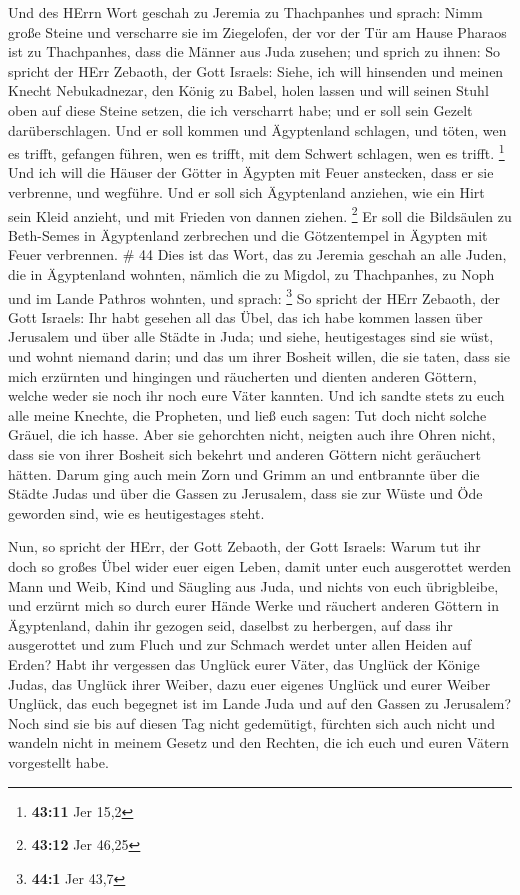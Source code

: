  Und des HErrn Wort geschah zu Jeremia zu Thachpanhes und
sprach:  Nimm große Steine und verscharre sie im Ziegelofen,
der vor der Tür am Hause Pharaos ist zu Thachpanhes, dass die Männer aus
Juda zusehen;  und sprich zu ihnen: So spricht der HErr
Zebaoth, der Gott Israels: Siehe, ich will hinsenden und meinen Knecht
Nebukadnezar, den König zu Babel, holen lassen und will seinen Stuhl
oben auf diese Steine setzen, die ich verscharrt habe; und er soll sein
Gezelt darüberschlagen.  Und er soll kommen und Ägyptenland
schlagen, und töten, wen es trifft, gefangen führen, wen es trifft, mit
dem Schwert schlagen, wen es trifft. \footnote{\textbf{43:11} Jer 15,2}
 Und ich will die Häuser der Götter in Ägypten mit Feuer
anstecken, dass er sie verbrenne, und wegführe. Und er soll sich
Ägyptenland anziehen, wie ein Hirt sein Kleid anzieht, und mit Frieden
von dannen ziehen. \footnote{\textbf{43:12} Jer 46,25}  Er
soll die Bildsäulen zu Beth-Semes in Ägyptenland zerbrechen und die
Götzentempel in Ägypten mit Feuer verbrennen. \# 44  Dies
ist das Wort, das zu Jeremia geschah an alle Juden, die in Ägyptenland
wohnten, nämlich die zu Migdol, zu Thachpanhes, zu Noph und im Lande
Pathros wohnten, und sprach: \footnote{\textbf{44:1} Jer 43,7}
 So spricht der HErr Zebaoth, der Gott Israels: Ihr habt
gesehen all das Übel, das ich habe kommen lassen über Jerusalem und über
alle Städte in Juda; und siehe, heutigestages sind sie wüst, und wohnt
niemand darin;  und das um ihrer Bosheit willen, die sie
taten, dass sie mich erzürnten und hingingen und räucherten und dienten
anderen Göttern, welche weder sie noch ihr noch eure Väter kannten.
 Und ich sandte stets zu euch alle meine Knechte, die
Propheten, und ließ euch sagen: Tut doch nicht solche Gräuel, die ich
hasse.  Aber sie gehorchten nicht, neigten auch ihre Ohren
nicht, dass sie von ihrer Bosheit sich bekehrt und anderen Göttern nicht
geräuchert hätten.  Darum ging auch mein Zorn und Grimm an
und entbrannte über die Städte Judas und über die Gassen zu Jerusalem,
dass sie zur Wüste und Öde geworden sind, wie es heutigestages steht.

 Nun, so spricht der HErr, der Gott Zebaoth, der Gott
Israels: Warum tut ihr doch so großes Übel wider euer eigen Leben, damit
unter euch ausgerottet werden Mann und Weib, Kind und Säugling aus Juda,
und nichts von euch übrigbleibe,  und erzürnt mich so durch
eurer Hände Werke und räuchert anderen Göttern in Ägyptenland, dahin ihr
gezogen seid, daselbst zu herbergen, auf dass ihr ausgerottet und zum
Fluch und zur Schmach werdet unter allen Heiden auf Erden? 
Habt ihr vergessen das Unglück eurer Väter, das Unglück der Könige
Judas, das Unglück ihrer Weiber, dazu euer eigenes Unglück und eurer
Weiber Unglück, das euch begegnet ist im Lande Juda und auf den Gassen
zu Jerusalem?  Noch sind sie bis auf diesen Tag nicht
gedemütigt, fürchten sich auch nicht und wandeln nicht in meinem Gesetz
und den Rechten, die ich euch und euren Vätern vorgestellt habe.

